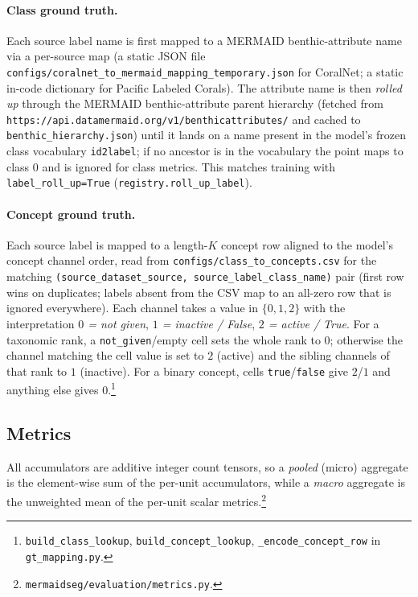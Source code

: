\paragraph{Class ground truth.}
Each source label name is first mapped to a MERMAID benthic-attribute name via a
per-source map (a static JSON file
\texttt{configs/coralnet\_to\_mermaid\_mapping\_temporary.json} for CoralNet; a
static in-code dictionary for Pacific Labeled Corals). The attribute name is then
\emph{rolled up} through the MERMAID benthic-attribute parent hierarchy
(fetched from \texttt{https://api.datamermaid.org/v1/benthicattributes/} and
cached to \texttt{benthic\_hierarchy.json}) until it lands on a name present in
the model's frozen class vocabulary \texttt{id2label}; if no ancestor is in the
vocabulary the point maps to class $0$ and is ignored for class metrics. This
matches training with \texttt{label\_roll\_up=True}
(\texttt{registry.roll\_up\_label}).

\paragraph{Concept ground truth.}
Each source label is mapped to a length-$K$ concept row aligned to the model's
concept channel order, read from \texttt{configs/class\_to\_concepts.csv} for the
matching \texttt{(source\_dataset\_source, source\_label\_class\_name)} pair
(first row wins on duplicates; labels absent from the CSV map to an all-zero row
that is ignored everywhere). Each channel takes a value in
$\{0,1,2\}$ with the interpretation
\emph{$0$ = not given}, \emph{$1$ = inactive / False}, \emph{$2$ = active /
True}. For a taxonomic rank, a \texttt{not\_given}/empty cell sets the whole rank
to $0$; otherwise the channel matching the cell value is set to $2$ (active) and
the sibling channels of that rank to $1$ (inactive). For a binary concept, cells
\texttt{true}/\texttt{false} give $2$/$1$ and anything else gives $0$.\footnote{%
\texttt{build\_class\_lookup}, \texttt{build\_concept\_lookup},
\texttt{\_encode\_concept\_row} in \texttt{gt\_mapping.py}.}

\subsection{Metrics}
\label{sec:eval-metrics}

All accumulators are additive integer count tensors, so a \emph{pooled} (micro)
aggregate is the element-wise sum of the per-unit accumulators, while a
\emph{macro} aggregate is the unweighted mean of the per-unit scalar metrics.\footnote{%
\texttt{mermaidseg/evaluation/metrics.py}.}

